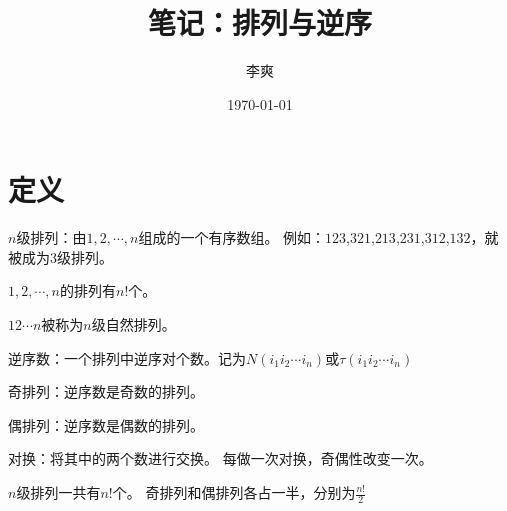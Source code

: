 \documentclass[UTF8, 12pt]{article} %
\title{笔记：排列与逆序}
\author{李爽}
\date{\today}
\begin{document}
\maketitle
\section{定义}
$n$级排列：由$1,2,\cdots,n$组成的一个有序数组。
例如：$123$,$321$,$213$,$231$,$312$,$132$，就被成为3级排列。

$1,2,\cdots,n$的排列有$n!$个。

$12\cdots n$被称为$n$级自然排列。

逆序数：一个排列中逆序对个数。记为$N(i_1 i_2 \cdots i_n)$或$\tau (i_1 i_2 \cdots i_n)$

奇排列：逆序数是奇数的排列。

偶排列：逆序数是偶数的排列。

对换：将其中的两个数进行交换。
每做一次对换，奇偶性改变一次。

$n$级排列一共有$n!$个。
奇排列和偶排列各占一半，分别为$\frac{n!}{2}$
\end{document}
